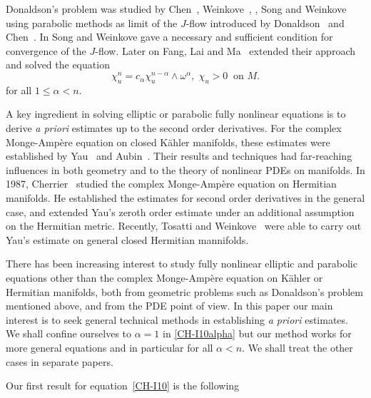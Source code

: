 \documentclass[12pt]{amsart}
\theoremstyle{definition}
\numberwithin{equation}{section}
\begin{document}
Donaldson's problem was studied by Chen~\cite{Chen04},
Weinkove~\cite{Weinkove04}, \cite{Weinkove06}, Song and Weinkove~\cite{SW08}
using parabolic methods as limit of the $J$-flow introduced by
Donaldson~\cite{Donaldson99a} and Chen~\cite{Chen00b}.
In \cite{SW08} Song and Weinkove gave a necessary and sufficient condition
for convergence of the $J$-flow. Later on
Fang, Lai and Ma~\cite{FLM11} extended their approach and solved the equation
 \begin{equation}
\label{CH-I10alpha}
 \chi_u^n =  c_{\alpha} \chi_u^{n-\alpha} \wedge \omega^{\alpha},
  \; \chi_u > 0 \;\; \mbox{on $M$}.
\end{equation}
for all $1 \leq {\alpha} < n$.

A key ingredient in solving elliptic or parabolic fully nonlinear equations
is to derive {\em a priori} estimates up to the second order derivatives.
For the complex Monge-Amp\`ere equation on closed K\"ahler manifolds, these
estimates were established by Yau~\cite{Yau78} and Aubin~\cite{Aubin78}.
Their results and techniques had far-reaching influences in both
geometry and to the theory of nonlinear PDEs on manifolds.
In 1987, Cherrier~\cite{Cherrier87} studied the complex Monge-Amp\`ere
equation on Hermitian manifolds. He established the estimates for second
order derivatives in the general case, and extended Yau's zeroth
order estimate under an additional assumption on the Hermitian metric.
Recently, Tosatti and Weinkove~\cite{TWv10b}  were able
to carry out Yau's estimate on general closed Hermitian mannifolds.

There has been increasing interest to study fully nonlinear elliptic and
parabolic equations other than the complex Monge-Amp\`ere equation on
K\"ahler or Hermitian manifolds, both from geometric problems such as
Donaldson's problem mentioned above, and from the PDE point of view.
In this paper our main interest is to seek general technical methods in
establishing {\em a priori} estimates. We shall confine ourselves to
$\alpha = 1$ in \eqref{CH-I10alpha} but our method works for more
general equations and in particular for all $\alpha < n$. We shall treat
the other cases in separate papers.

Our first result for equation~\eqref{CH-I10} is the following
\end{document}

